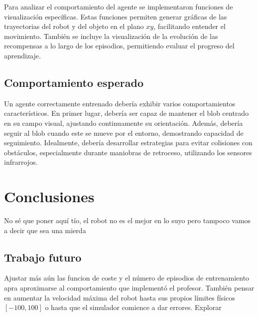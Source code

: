 \documentclass[12pt,a4paper]{article}
\begin{document}
Para analizar el comportamiento del agente se implementaron funciones de
visualización específicas. Estas funciones permiten generar gráficas de las
trayectorias del robot y del objeto en el plano $xy$, facilitando entender el
movimiento. También se incluye la visualización de la evolución de las
recompensas a lo largo de los episodios, permitiendo evaluar el progreso del
aprendizaje. 
\subsection{Comportamiento esperado}

Un agente correctamente entrenado debería exhibir varios comportamientos
característicos. En primer lugar, debería ser capaz de mantener el blob centrado
en su campo visual, ajustando continuamente su orientación. Además, debería
seguir al blob cuando este se mueve por el entorno, demostrando
capacidad de seguimiento. 
Idealmente, debería desarrollar estrategias para evitar colisiones con
obstáculos, especialmente durante maniobras de retroceso, utilizando
los sensores infrarrojos.

\section{Conclusiones}

No sé que poner aquí tío, el robot no es el mejor en lo suyo pero tampoco vamos a decir que sea una mierda

\subsection{Trabajo futuro}

Ajustar más aún las funcion de coste y el número  de episodios de entrenamiento
apra aproximarse al comportamiento que implementó el profesor. También pensar en
aumentar la velocidad máxima del robot hasta sus propios límites físicos
$[-100,100]$ o hasta que el simulador comience a dar errores.
Explorar 
\end{document}
